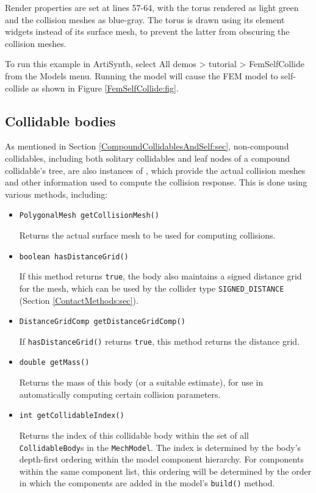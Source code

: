 Render properties are set at lines 57-64, with the torus rendered as
light green and the collision meshes as blue-gray. The torus is drawn
using its element widgets instead of its surface mesh, to prevent
the latter from obscuring the collision meshes.

To run this example in ArtiSynth, select {\sf All demos > tutorial >
FemSelfCollide} from the {\sf Models} menu. Running the model will
cause the FEM model to self-collide as shown in
Figure \ref{FemSelfCollide:fig}.

\subsection{Collidable bodies}
\label{CollidableBodies:sec}

As mentioned in Section \ref{CompoundCollidablesAndSelf:sec},
non-compound collidables, including both solitary collidables and leaf
nodes of a compound collidable's tree, 
are also instances of 
, which
provide the actual collision meshes and other information used to
compute the collision response. This is done using various
methods, including:

\begin{itemize}

\item {\tt PolygonalMesh getCollisionMesh()}

Returns the actual surface mesh to be used for computing collisions.

\item {\tt boolean hasDistanceGrid()}

If this method returns {\tt true}, the body also maintains a signed
distance grid for the mesh, which can be used by the collider type
{\tt SIGNED\_DISTANCE} (Section
\ref{ContactMethods:sec}).

\item {\tt DistanceGridComp getDistanceGridComp()}

If {\tt hasDistanceGrid()} returns {\tt true}, this method returns the
distance grid.

\item {\tt double getMass()}

Returns the mass of this body (or a suitable estimate), for use
in automatically computing certain collision parameters.

\item {\tt int getCollidableIndex()}

Returns the index of this collidable body within the set of all {\tt
CollidableBody}s in the {\tt MechModel}. The index is determined by
the body's depth-first ordering within the model component
hierarchy. For components within the same component list, this ordering
will be determined by the order in which the components are added in
the model's {\tt build()} method.

\end{itemize}
%

